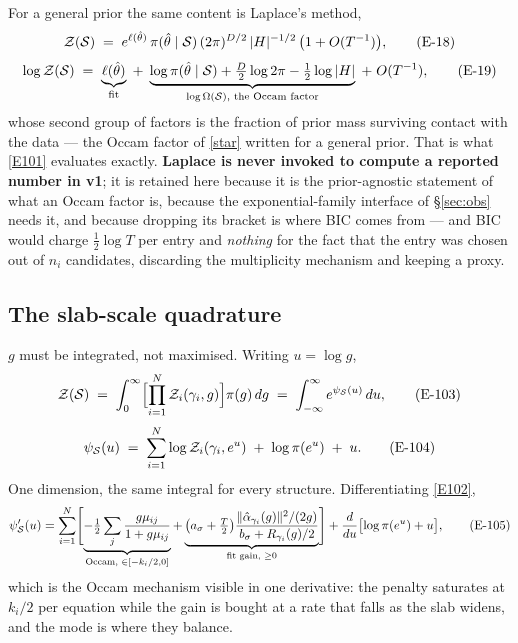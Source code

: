 \begin{remark}\label{rem:laplace}
For a general prior the same content is Laplace's method,
\begin{equation}
\mathcal{Z}(\mathcal{S}) \;=\; e^{\ell(\hat\theta)}\,\pi(\hat\theta\mid\mathcal{S})\,(2\pi)^{D/2}\,
|H|^{-1/2}\,\bigl(1+O(T^{-1})\bigr),
\tag{E-18}\label{E18}
\end{equation}
\begin{equation}
\log\mathcal{Z}(\mathcal{S}) \;=\; \underbrace{\ell(\hat\theta)}_{\text{fit}} \;+\;
\underbrace{\log\pi(\hat\theta\mid\mathcal{S}) + \tfrac{D}{2}\log2\pi
 - \tfrac12\log|H|}_{\log\Omega(\mathcal{S}),\text{ the Occam factor}} \;+\; O(T^{-1}),
\tag{E-19}\label{E19}
\end{equation}
whose second group of factors is the fraction of prior mass surviving contact with
the data --- the Occam factor of \eqref{star} written for a general prior. That is
what \eqref{E101} evaluates exactly. \textbf{Laplace is never invoked to compute a
reported number in v1}; it is retained here because it is the prior-agnostic
statement of what an Occam factor is, because the exponential-family interface of
\S\ref{sec:obs} needs it, and because dropping its bracket is where BIC comes from ---
and BIC would charge $\frac12\log T$ per entry and \emph{nothing} for the fact that
the entry was chosen out of $n_i$ candidates, discarding the multiplicity mechanism
and keeping a proxy.
\end{remark}

\subsection{The slab-scale quadrature}\label{sec:quad}

$g$ must be integrated, not maximised. Writing $u=\log g$,
\begin{equation}
\mathcal{Z}(\mathcal{S}) \;=\; \int_0^\infty\Bigl[\prod_{i=1}^{N}\mathcal{Z}_i(\gamma_i,g)\Bigr]\pi(g)\,dg
\;=\; \int_{-\infty}^{\infty} e^{\psi_{\mathcal{S}}(u)}\,du,
\tag{E-103}\label{E103}
\end{equation}
\begin{equation}
\psi_{\mathcal{S}}(u) \;=\; \sum_{i=1}^{N}\log\mathcal{Z}_i(\gamma_i,e^u) \;+\; \log\pi(e^u) \;+\; u.
\tag{E-104}\label{E104}
\end{equation}
One dimension, the same integral for every structure. Differentiating \eqref{E102},
\begin{equation}
\psi_{\mathcal{S}}'(u) = \sum_{i=1}^{N}\Biggl[
\underbrace{-\tfrac12\sum_j\frac{g\mu_{ij}}{1+g\mu_{ij}}}_{\text{Occam, }\in[-k_i/2,0]}
+ \underbrace{\bigl(a_\sigma+\tfrac{T}{2}\bigr)
  \frac{\|\hat\alpha_{\gamma_i}(g)\|^2/(2g)}{b_\sigma+R_{\gamma_i}(g)/2}}_{\text{fit gain, }\ge0}
\Biggr] + \frac{d}{du}\bigl[\log\pi(e^u)+u\bigr],
\tag{E-105}\label{E105}
\end{equation}
which is the Occam mechanism visible in one derivative: the penalty saturates at
$k_i/2$ per equation while the gain is bought at a rate that falls as the slab
widens, and the mode is where they balance.


